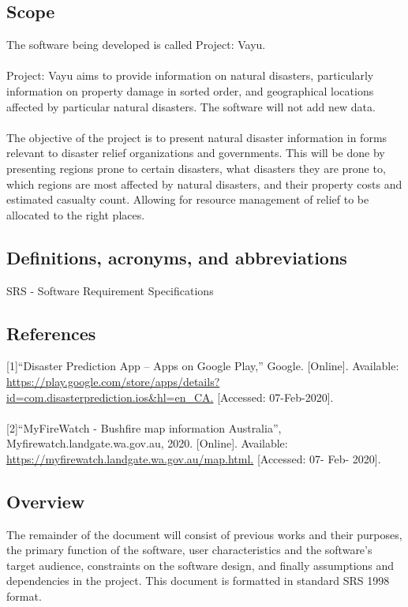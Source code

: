 \documentclass{article}
\begin{document}
\subsection{Scope}
The software being developed is called Project: Vayu.\\\\

Project: Vayu aims to provide information on natural disasters,
particularly information on property damage in sorted order, and
geographical locations affected by particular natural disasters.
The software will not add new data.\\\\

The objective of the project is to present natural disaster information in forms relevant to
disaster relief organizations and governments. This will be done by presenting regions prone to
certain disasters, what disasters they are prone to, which regions are most affected by natural disasters,
and their property costs and estimated casualty count. Allowing for
resource management of relief to be allocated to the right places.

\subsection{Definitions, acronyms, and abbreviations}
SRS - Software Requirement Specifications

\subsection{References}
[1]“Disaster Prediction App – Apps on Google Play,” Google. [Online].
Available: \url{ https://play.google.com/store/apps/details?id=com.disasterprediction.ios&hl=en_CA.} [Accessed: 07-Feb-2020]. \\\\

[2]“MyFireWatch - Bushfire map information Australia”, Myfirewatch.landgate.wa.gov.au, 2020. [Online].
Available: \url{ https://myfirewatch.landgate.wa.gov.au/map.html.} [Accessed: 07- Feb- 2020].

\subsection{Overview}
The remainder of the document will consist of previous works and their purposes,
the primary function of the software, user characteristics and the software’s
target audience, constraints on the software design, and finally assumptions and
dependencies in the project. This document is formatted in standard SRS 1998 format.
\end{document}
